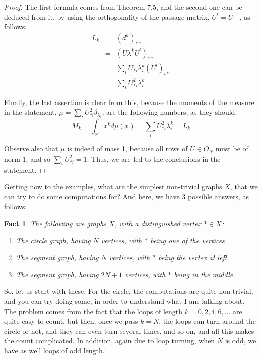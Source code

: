 \documentclass[12pt]{amsbook}
\newtheorem{fact}[theorem]{Fact}
\begin{document}
\begin{proof}
The first formula comes from Theorem 7.5, and the second one can be deduced from it, by using the orthogonality of the passage matrix, $U^t=U^{-1}$, as follows:
\begin{eqnarray*}
L_k
&=&(d^k)_{**}\\
&=&(U\lambda^kU^t)_{**}\\
&=&\sum_iU_{*i}\lambda_i^k(U^t)_{i*}\\
&=&\sum_iU_{*i}^2\lambda_i^k
\end{eqnarray*}

Finally, the last assertion is clear from this, because the moments of the measure in the statement, $\mu=\sum_iU_{*i}^2\delta_{\lambda_i}$, are the following numbers, as they should:
$$M_k
=\int_\mathbb Rx^kd\mu(x)
=\sum_iU_{*i}^2\lambda_i^k
=L_k$$

Observe also that $\mu$ is indeed of mass 1, because all rows of $U\in O_N$ must be of norm 1, and so $\sum_iU_{*i}^2=1$. Thus, we are led to the conclusions in the statement.
\end{proof}

Getting now to the examples, what are the simplest non-trivial graphs $X$, that we can try to do some computations for? And here, we have 3 possible answers, as follows:


\begin{fact}
The following are graphs $X$, with a distinguished vertex $*\in X$:
\begin{enumerate}
\item The circle graph, having $N$ vertices, with $*$ being one of the vertices.

\item The segment graph, having $N$ vertices, with $*$ being the vertex at left.

\item The segment graph, having $2N+1$ vertices, with $*$ being in the middle.
\end{enumerate}
\end{fact}

So, let us start with these. For the circle, the computations are quite non-trivial, and you can try doing some, in order to understand what I am talking about. The problem comes from the fact that the loops of length $k=0,2,4,6,\ldots$ are quite easy to count, but then, once we pass $k=N$, the loops can turn around the circle or not, and they can even turn several times, and so on, and all this makes the count complicated. In addition, again due to loop turning, when $N$ is odd, we have as well loops of odd length.
\end{document}
